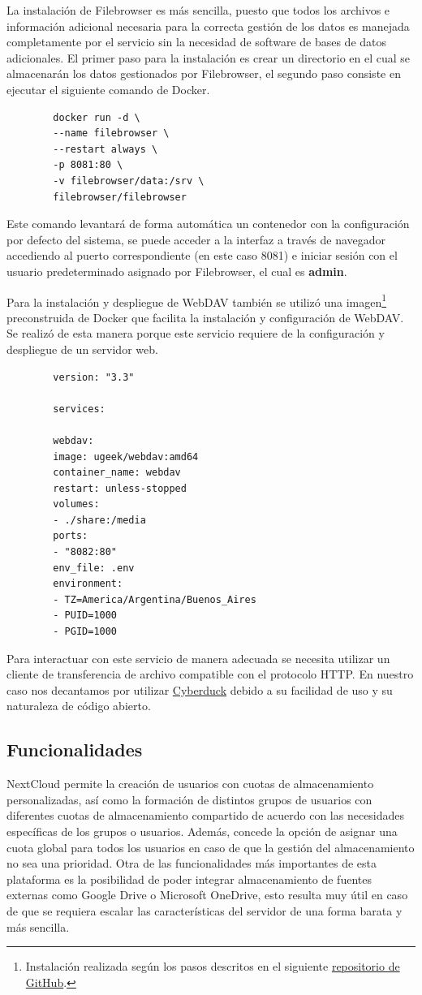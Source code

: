 \documentclass[a4paper,10pt]{article}
\begin{document}
	La instalación de Filebrowser es más sencilla, puesto que todos los archivos e información adicional necesaria para la correcta gestión de los datos es manejada completamente por el servicio sin la necesidad de software de bases de datos adicionales. El primer paso para la instalación es crear un directorio en el cual se almacenarán los datos gestionados por Filebrowser, el segundo paso consiste en ejecutar el siguiente comando de Docker.

	
	\begin{verbatim}
		docker run -d \
		--name filebrowser \
		--restart always \
		-p 8081:80 \
		-v filebrowser/data:/srv \
		filebrowser/filebrowser
	\end{verbatim}
	
	Este comando levantará de forma automática un contenedor con la configuración por defecto del sistema, se puede acceder a la interfaz a través de navegador accediendo al puerto correspondiente (en este caso 8081) e iniciar sesión con el usuario predeterminado asignado por Filebrowser, el cual es \textbf{admin}.
	
	Para la instalación y despliegue de WebDAV también se utilizó una imagen\footnote{Instalación realizada según los pasos descritos en el siguiente \href{https://github.com/jmlcas/webdav/}{repositorio de GitHub}.} preconstruida de Docker que facilita la instalación y configuración de WebDAV. Se realizó de esta manera porque este servicio requiere de la configuración y despliegue de un servidor web. 
	
	\begin{verbatim}
		version: "3.3"
		
		services:
		
		webdav:
		image: ugeek/webdav:amd64    
		container_name: webdav
		restart: unless-stopped
		volumes:
		- ./share:/media
		ports:
		- "8082:80"
		env_file: .env 	 
		environment:
		- TZ=America/Argentina/Buenos_Aires
		- PUID=1000
		- PGID=1000
	\end{verbatim}
	
	Para interactuar con este servicio de manera adecuada se necesita utilizar un cliente de transferencia de archivo compatible con el protocolo HTTP. En nuestro caso nos decantamos por utilizar \href{https://cyberduck.io/}{Cyberduck} debido a su facilidad de uso y su naturaleza de código abierto.
	
	\subsection{Funcionalidades}
	NextCloud permite la creación de usuarios con cuotas de almacenamiento personalizadas, así como la formación de distintos grupos de usuarios con diferentes cuotas de almacenamiento compartido de acuerdo con las necesidades específicas de los grupos o usuarios. Además, concede la opción de asignar una cuota global para todos los usuarios en caso de que la gestión del almacenamiento no sea una prioridad. Otra de las funcionalidades más importantes de esta plataforma es la posibilidad de poder integrar almacenamiento de fuentes externas como Google Drive o Microsoft OneDrive, esto resulta muy útil en caso de que se requiera escalar las características del servidor de una forma barata y más sencilla.
\end{document}
